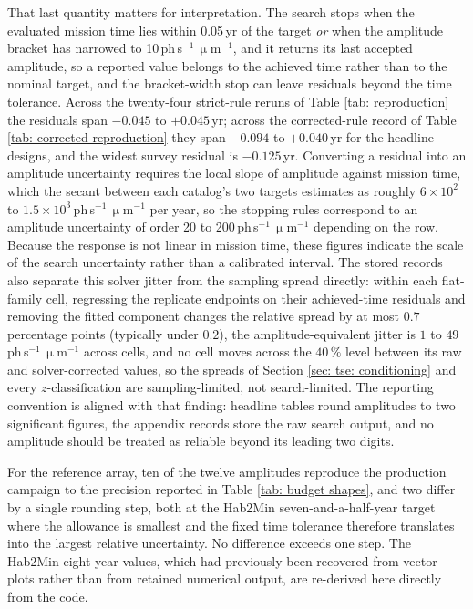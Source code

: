 \documentclass[12pt,a4paper]{article}
\numberwithin{equation}{section}
\numberwithin{figure}{section}
\numberwithin{table}{section}
\begin{document}
That last quantity matters for interpretation. The search stops when the evaluated mission time lies within 0.05\,yr of the target \emph{or} when the amplitude bracket has narrowed to 10\,ph\,s$^{-1}$\,$\upmu$m$^{-1}$, and it returns its last accepted amplitude, so a reported value belongs to the achieved time rather than to the nominal target, and the bracket-width stop can leave residuals beyond the time tolerance. Across the twenty-four strict-rule reruns of Table \ref{tab: reproduction} the residuals span $-0.045$ to $+0.045$\,yr; across the corrected-rule record of Table \ref{tab: corrected reproduction} they span $-0.094$ to $+0.040$\,yr for the headline designs, and the widest survey residual is $-0.125$\,yr. Converting a residual into an amplitude uncertainty requires the local slope of amplitude against mission time, which the secant between each catalog's two targets estimates as roughly $6\times10^{2}$ to $1.5\times10^{3}$\,ph\,s$^{-1}$\,$\upmu$m$^{-1}$ per year, so the stopping rules correspond to an amplitude uncertainty of order 20 to 200\,ph\,s$^{-1}$\,$\upmu$m$^{-1}$ depending on the row. Because the response is not linear in mission time, these figures indicate the scale of the search uncertainty rather than a calibrated interval. The stored records also separate this solver jitter from the sampling spread directly: within each flat-family cell, regressing the replicate endpoints on their achieved-time residuals and removing the fitted component changes the relative spread by at most $0.7$ percentage points (typically under $0.2$), the amplitude-equivalent jitter is $1$ to $49$\,ph\,s$^{-1}$\,$\upmu$m$^{-1}$ across cells, and no cell moves across the $40\,\%$ level between its raw and solver-corrected values, so the spreads of Section \ref{sec: tse: conditioning} and every $z$-classification are sampling-limited, not search-limited. The reporting convention is aligned with that finding: headline tables round amplitudes to two significant figures, the appendix records store the raw search output, and no amplitude should be treated as reliable beyond its leading two digits.

For the reference array, ten of the twelve amplitudes reproduce the production campaign to the precision reported in Table \ref{tab: budget shapes}, and two differ by a single rounding step, both at the Hab2Min seven-and-a-half-year target where the allowance is smallest and the fixed time tolerance therefore translates into the largest relative uncertainty. No difference exceeds one step. The Hab2Min eight-year values, which had previously been recovered from vector plots rather than from retained numerical output, are re-derived here directly from the code.
\end{document}
